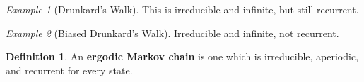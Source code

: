 \documentclass[12pt]{article}
\theoremstyle{definition}
\newtheorem{definition}{Definition}[section]
\theoremstyle{remark}
\newtheorem{example}{Example}[section]
\begin{document}
\begin{example}[Drunkard's Walk]
This is irreducible and infinite, but still recurrent.
\end{example}

\begin{example}[Biased Drunkard's Walk]
Irreducible and infinite, not recurrent.
\end{example}

\begin{definition}
An \textbf{ergodic Markov chain} is one which is irreducible, aperiodic, and recurrent for every state.
\end{definition}

\Blindtext
\end{document}
